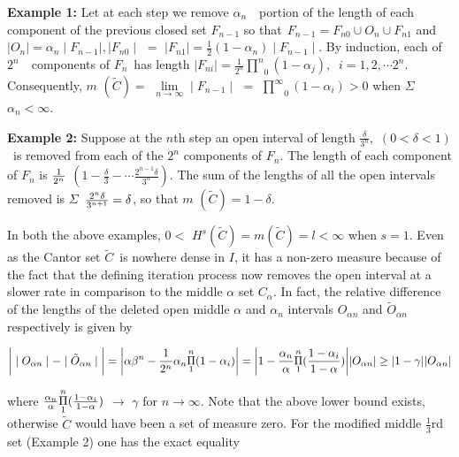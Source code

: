 \documentclass[12pt]{article}
\begin{document}
\vspace{.25cm}

\textbf{Example 1:} Let at each step we remove $\alpha _{n}$\ \ portion of
the length of each component of the previous closed set $F_{n-1}$ so that$\
\ F_{n-1}=F_{n0}\cup O_{n}\cup F_{n1}$ and $\mid O_{n}\mid =\alpha _{n}\mid
F_{n-1}\mid ,\mid F_{n0}\mid $ $=$ $\mid F_{n1}\mid =\frac{1}{2}(1-\alpha
_{n})\mid F_{n-1}\mid$. By induction, each of $2^{n}$\ \ components of $F_{n}
$\ has length $\mid F_{ni}\mid =\frac{1}{2^{n}}\underset{0}{\overset{n}{\prod }
}(1-\alpha _{j}),$ $\ i=1,2,\cdots 2^{n}.$ Consequently, $m$ $(\tilde{C})=$ $
\underset{n\rightarrow \infty }{\lim }\mid F_{n-1}\mid $ $=$ $\underset{0}{
\overset{\infty}{\prod}}(1-\alpha _{i})>0$ when $\Sigma $ $\alpha
_{n}<\infty .$

\vspace{.25cm}

\textbf{Example 2:} Suppose at the $n$th step an open interval of length $%
\frac{\delta }{3^{n}},$ $(0<\delta <1)$\ is removed from each of the $2^{n}$
components of $F_{n}$. The length of each component of $F_{n}$ is $\frac{1}{%
2^{n}}$ $(1-\frac{\delta }{3}-\cdots \frac{2^{n-1}\delta }{3^{n}}).$ The sum
of the lengths of all the open intervals removed is $\Sigma $\ $\frac{%
2^{n}\delta }{3^{n+1}}=\delta $, so that $m$ $(\tilde{C})=1-\delta.$

\vspace{.25cm}

In both the above examples, $0<$ $H^{s}(\tilde C)=m(\tilde C) = l<\infty $
when $s=1$. Even as the Cantor set 
$\tilde{C}$\ is nowhere dense in $I$, it has a non-zero measure because of
the fact that the defining iteration process now removes the open interval
at a slower rate in comparison to the middle $\alpha $ set $C_{\alpha }$. In
fact, the relative difference of the lengths of the deleted open middle $%
\alpha $ and $\alpha _{n}$ intervals $O_{\alpha n}$ and $\tilde{O}_{\alpha n}
$ respectively is given by

$$\bigg | \mid O_{\alpha n}\mid -\mid  \tilde{O}_{\alpha n} \mid
\bigg | = \bigg | \alpha \beta ^{n}- \frac{1}{2^{n}} \alpha _{n}\underset{%
1}{\overset{n}{\Pi }}(1-\alpha _{i})\bigg |  = \bigg | 1-\frac{\alpha _{n}}{%
\alpha }\underset{1}{\overset{n}{\Pi }}(\frac{1-\alpha _{i}}{1-\alpha })\bigg |
 | O_{\alpha n} |  \geq   | 1-\gamma  | | O_{\alpha n}| $$

\noindent where $\frac{\alpha _{n}}{\alpha }\underset{1}{\overset{n}{\Pi }}(\frac{%
1-\alpha _{i}}{1-\alpha })$ $\rightarrow $ $\gamma $ for $n\rightarrow
\infty.$ Note that the above lower bound exists, otherwise $\tilde{C}$ would
have been a set of measure zero. For the modified middle $\frac{1}{3}$rd set
(Example 2) one has the exact equality
\end{document}
